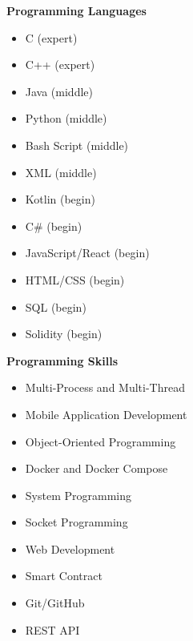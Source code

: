\documentclass[a4paper,11pt]{article}
\begin{document}
\noindent
\begin{minipage}[t]{0.48\textwidth}
    \textbf{Programming Languages}
    \vspace{0.2em}
    \begin{itemize}[leftmargin=2em]
        \item C (expert)
        \item C++ (expert)
        \item Java (middle)
        \item Python (middle)
        \item Bash Script (middle)
        \item XML (middle)
        \item Kotlin (begin)
        \item C\# (begin)
		\item JavaScript/React (begin)
        \item HTML/CSS (begin)
        \item SQL (begin)
        \item Solidity (begin)
    \end{itemize}
\end{minipage}%
\hfill
\begin{minipage}[t]{0.48\textwidth}
    \textbf{Programming Skills}
    \vspace{0.2em}
    \begin{itemize}[leftmargin=2em]
        \item Multi-Process and Multi-Thread
        \item Mobile Application Development
        \item Object-Oriented Programming
        \item Docker and Docker Compose
        \item System Programming
        \item Socket Programming
        \item Web Development
        \item Smart Contract
        \item Git/GitHub
		\item REST API
    \end{itemize}
\end{minipage}
\end{document}
